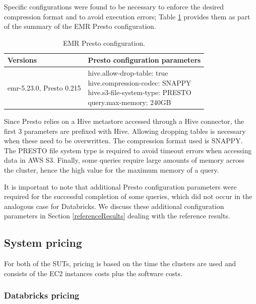 Specific configurations were found to be necessary to enforce the desired compression format and to avoid execution errors; Table \ref{table:softwareConfPresto} provides them as part of the summary of the EMR Presto configuration.

\begin{table}
  \centering
	\begin{tabular}{|l|l|}
	  \hline
		\textbf{Versions} & \textbf{Presto configuration parameters} \\ \hline
		emr-5.23.0, Presto 0.215 & \makecell[l]{hive.allow-drop-table: true \\ hive.compression-codec: SNAPPY \\
		hive.s3-file-system-type: PRESTO \\ query.max-memory: 240GB} \\ \hline
	\end{tabular}
	\caption{EMR Presto configuration.}
	\label{table:softwareConfPresto}
\end{table}

Since Presto relies on a Hive metastore accessed through a Hive connector, the first 3 parameters are prefixed with Hive. Allowing dropping tables is necessary when these need to be overwritten. The compression format used is SNAPPY. The PRESTO file system type is required to avoid timeout errors when accessing data in AWS S3. Finally, some queries require large amounts of memory across the cluster, hence the high value for the maximum memory of a query.

It is important to note that additional Presto configuration parameters were required for the successful completion of some queries, which did not occur in the analogous case for Databricks. We discuss these additional configuration parameters in Section \ref{referenceResults} dealing with the reference results.

\subsection{System pricing}

For both of the SUTs, pricing is based on the time the clusters are used and consists of the EC2 instances costs plus the software costs.

\subsubsection{Databricks pricing}

